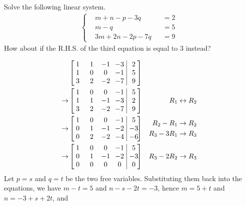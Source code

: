 \begin{Exercise}
Solve the following linear system.
\begin{align*}
\left\{\begin{alignedat}{2}
&m + n - p - 3q& &= 2\\
&m - q& &= 5\\
&3m + 2n - 2p - 7q& &= 9
\end{alignedat}\right.
\end{align*}
How about if the R.H.S. of the third equation is equal to $3$ instead?
\end{Exercise}
\begin{Answer}
\begin{align*}
&\left[
\begin{array}{@{}wc{10pt}wc{10pt}wc{10pt}wc{10pt}|wc{10pt}@{}}
1 & 1 & -1 & -3 & 2\\
1 & 0 & 0 & -1 & 5\\
3 & 2 & -2 & -7 & 9
\end{array}
\right]\\
\to &
\left[
\begin{array}{@{}wc{10pt}wc{10pt}wc{10pt}wc{10pt}|wc{10pt}@{}}
1 & 0 & 0 & -1 & 5\\
1 & 1 & -1 & -3 & 2\\
3 & 2 & -2 & -7 & 9
\end{array}
\right] & R_1 \leftrightarrow R_2 \\
\to &
\left[
\begin{array}{@{}wc{10pt}wc{10pt}wc{10pt}wc{10pt}|wc{10pt}@{}}
1 & 0 & 0 & -1 & 5\\
0 & 1 & -1 & -2 & -3\\
0 & 2 & -2 & -4 & -6
\end{array}
\right] &
\begin{aligned}
R_2 - R_1 &\to R_2 \\
R_3 - 3R_1 &\to R_3    
\end{aligned} \\
\to &
\left[
\begin{array}{@{}wc{10pt}wc{10pt}wc{10pt}wc{10pt}|wc{10pt}@{}}
1 & 0 & 0 & -1 & 5\\
0 & 1 & -1 & -2 & -3\\
0 & 0 & 0 & 0 & 0
\end{array}
\right] & R_3 - 2R_2 \to R_3
\end{align*}
Let $p = s$ and $q = t$ be the two free variables. Substituting them back into the equations, we have $m-t=5$ and $n-s-2t=-3$, hence $m=5+t$ and $n=-3+s+2t$, and
\begin{equation*}

\end{equation*}
\end{Answer}

